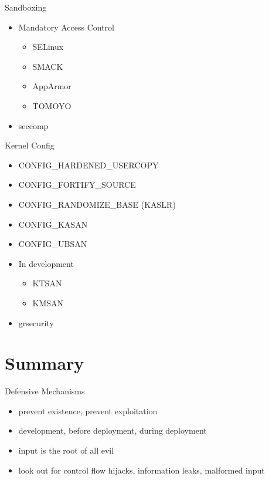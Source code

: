 \documentclass{curs}
\begin{document}
\begin{frame}{Sandboxing}
  \begin{itemize}
    \item Mandatory Access Control
      \begin{itemize}
        \item SELinux
        \item SMACK
        \item AppArmor
        \item TOMOYO
      \end{itemize}
    \item seccomp
  \end{itemize}
\end{frame}

\begin{frame}{Kernel Config}
  \begin{itemize}
    \item CONFIG_HARDENED_USERCOPY
    \item CONFIG_FORTIFY_SOURCE
    \item CONFIG_RANDOMIZE_BASE (KASLR)
    \item CONFIG_KASAN
    \item CONFIG_UBSAN
    \item In development
      \begin{itemize}
        \item KTSAN
        \item KMSAN
      \end{itemize}
    \item grsecurity
  \end{itemize}
\end{frame}


\section{Summary}

\begin{frame}{Defensive Mechanisms}
  \begin{itemize}
    \item prevent existence, prevent exploitation
    \item development, before deployment, during deployment
    \item input is the root of all evil
    \item look out for control flow hijacks, information leaks, malformed input
  \end{itemize}
\end{frame}
\end{document}
